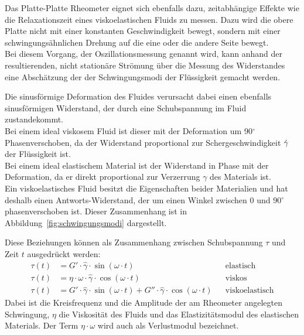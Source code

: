 Das Platte-Platte Rheometer eignet sich ebenfalls dazu, zeitabhängige Effekte wie die Relaxationszeit eines viskoelastischen Fluids zu messen.
Dazu wird die obere Platte nicht mit einer konstanten Geschwindigkeit bewegt, sondern mit einer schwingungsähnlichen Drehung auf die eine oder die andere Seite bewegt.\\
Bei diesem Vorgang, der Oszillationsmessung genannt wird, kann anhand der resultierenden, nicht stationäre Strömung über die Messung des Widerstandes eine Abschätzung der der Schwingungsmodi der Flüssigkeit gemacht werden.

Die sinusförmige Deformation  des Fluides verursacht dabei einen ebenfalls sinusförmigen Widerstand, der durch eine Schubspannung  im Fluid zustandekommt.\\
Bei einem ideal viskosem Fluid ist dieser mit der Deformation um 90$^\circ$ Phasenverschoben, da der Widerstand proportional zur Schergeschwindigkeit $\dot\gamma$ der Flüssigkeit ist.\\
Bei einem ideal elastischem Material ist der Widerstand in Phase mit der Deformation, da er direkt proportional zur Verzerrung $\gamma$ des Materials ist.\\
Ein viskoelastisches Fluid besitzt die Eigenschaften beider Materialien und hat deshalb einen Antworts-Widerstand, der um einen Winkel zwischen 0 und 90$^\circ$ phasenverschoben ist. Dieser Zusammenhang ist in Abbildung~\ref{fig:schwingungsmodi} dargestellt.

Diese Beziehungen können als Zusammenhang zwischen Schubspannung $\tau$ und Zeit $t$ ausgedrückt werden:
\begin{align}
    \label{eq:schwingungsmodi}
    \tau\left( t \right)&=G'\cdot\hat{\gamma}\cdot \sin\left( \omega\cdot t \right) && \text{elastisch}\\
    \tau\left( t \right)&=\eta\cdot\omega\cdot\hat{\gamma}\cdot \cos\left( \omega\cdot t \right)&& \text{viskos}\\
    \tau\left( t \right)&=G'\cdot\hat{\gamma}\cdot \sin\left( \omega\cdot t \right)+G''\cdot\hat{\gamma}\cdot \cos\left( \omega\cdot t \right)&& \text{viskoelastisch}
\end{align}
Dabei ist  die Kreisfrequenz und  die Amplitude der am Rheometer angelegten Schwingung, $\eta$ die Viskosität des Fluids und  das Elastizitätsmodul des elastischen Materials. Der Term $\eta\cdot\omega$ wird auch als Verlustmodul  bezeichnet.

